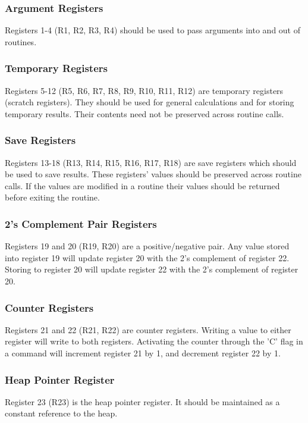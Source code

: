 \documentclass[12pt]{article}
\begin{document}
    \subsubsection{Argument Registers}
        Registers 1-4 (R1, R2, R3, R4) should be used to pass arguments into and out of routines.
        
    \subsubsection{Temporary Registers}
        Registers 5-12 (R5, R6, R7, R8, R9, R10, R11, R12) are temporary registers (scratch registers). They should be used for general calculations and for storing temporary results. Their contents need not be preserved across routine calls.
        
    \subsubsection{Save Registers}
        Registers 13-18 (R13, R14, R15, R16, R17, R18) are save registers which should be used to save results. These registers' values should be preserved across routine calls. If the values are modified in a routine their values should be returned before exiting the routine.
        
    \subsubsection{2's Complement Pair Registers}
        Registers 19 and 20 (R19, R20) are a positive/negative pair. Any value stored into register 19 will update register 20 with the 2's complement of register 22. Storing to register 20 will update register 22 with the 2's complement of register 20.
        
    \subsubsection{Counter Registers}
        Registers 21 and 22 (R21, R22) are counter registers. Writing a value to either register will write to both registers. Activating the counter through the 'C' flag in a command will increment register 21 by 1, and decrement register 22 by 1.
        
    \subsubsection{Heap Pointer Register}
        Register 23 (R23) is the heap pointer register. It should be maintained as a constant reference to the heap.
        
\end{document}

